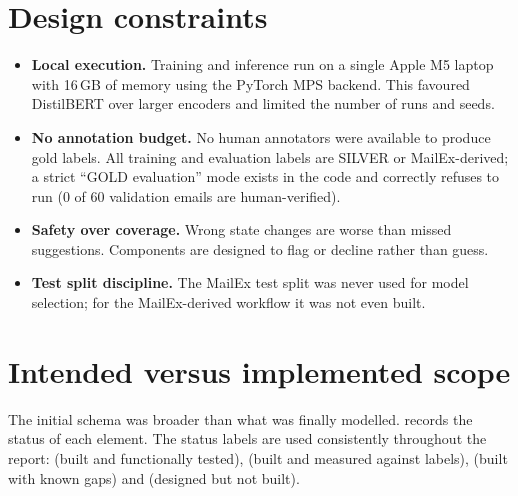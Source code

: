\section{Design constraints}
\begin{itemize}
  \item \textbf{Local execution.} Training and inference run on a single Apple M5 laptop with 16\,GB of memory using the PyTorch MPS backend. This favoured DistilBERT over larger encoders and limited the number of runs and seeds.
  \item \textbf{No annotation budget.} No human annotators were available to produce gold labels. All training and evaluation labels are SILVER or MailEx-derived; a strict ``GOLD evaluation'' mode exists in the code and correctly refuses to run (0 of 60 validation emails are human-verified).
  \item \textbf{Safety over coverage.} Wrong state changes are worse than missed suggestions. Components are designed to flag or decline rather than guess.
  \item \textbf{Test split discipline.} The MailEx test split was never used for model selection; for the MailEx-derived workflow it was not even built.
\end{itemize}

\section{Intended versus implemented scope}
The initial schema was broader than what was finally modelled.  records the status of each element. The status labels are used consistently throughout the report:  (built and functionally tested),  (built and measured against labels),  (built with known gaps) and  (designed but not built).


